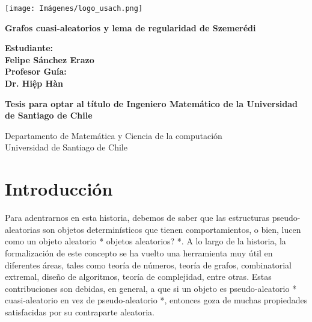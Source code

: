 \documentclass{article}[14pts]
\newcommand{\hh}[1]{{\color{red} * #1 *}}
\begin{document}
\begin{titlepage}
   \begin{center}

       \texttt{[image: Imágenes/logo\_usach.png]}
       \vspace{1.5cm}

       \textbf{\LARGE Grafos cuasi-aleatorios y lema de regularidad de Szemerédi}

       \vspace{0.5cm}

       \vspace{1.5cm}

       \textbf{\textbf{Estudiante:} \\Felipe Sánchez Erazo\\   \vspace{1.5cm} \textbf{Profesor Guía:}   \vspace{0.5cm} \\ Dr. Hi\d{ê}p Hàn}

       \vspace{1.cm}
            
\textbf{Tesis para optar al título de Ingeniero Matemático de la Universidad de Santiago de Chile}\\      
\vspace{0.5cm}

Departamento de Matemática y Ciencia de la computación \\
Universidad de Santiago de Chile \\
\date{\today}
            
       \vspace{0.8cm}
     
           \vspace{0.5cm}

   \end{center}
\end{titlepage}

\newpage


\section{Introducción}

Para adentrarnos en esta historia, debemos de saber que las estructuras pseudo-aleatorias son objetos determinísticos que tienen comportamientos, o bien, lucen como un objeto aleatorio\hh{objetos aleatorios?}. A lo largo de la historia, la formalización de este concepto se ha vuelto una herramienta muy útil en diferentes áreas, tales como teoría de números, teoría de grafos, combinatorial extremal, diseño de algoritmos, teoría de complejidad, entre otras. Estas contribuciones son debidas, en general, a que si un objeto es pseudo-aleatorio \hh{cuasi-aleatorio en vez de pseudo-aleatorio}, entonces goza de muchas propiedades satisfacidas por su contraparte aleatoria.\\
\end{document}
